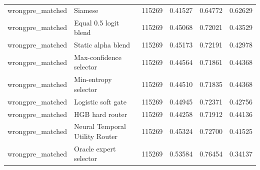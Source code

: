 \begin{tabular}{llrrrr}
wrongpre\_matched & Siamese & 115269 & 0.41527 & 0.64772 & 0.62629 \\
wrongpre\_matched & Equal 0.5 logit blend & 115269 & 0.45068 & 0.72021 & 0.43529 \\
wrongpre\_matched & Static alpha blend & 115269 & 0.45173 & 0.72191 & 0.42978 \\
wrongpre\_matched & Max-confidence selector & 115269 & 0.44564 & 0.71861 & 0.44368 \\
wrongpre\_matched & Min-entropy selector & 115269 & 0.44510 & 0.71835 & 0.44368 \\
wrongpre\_matched & Logistic soft gate & 115269 & 0.44945 & 0.72371 & 0.42756 \\
wrongpre\_matched & HGB hard router & 115269 & 0.44258 & 0.71912 & 0.44136 \\
wrongpre\_matched & Neural Temporal Utility Router & 115269 & 0.45324 & 0.72700 & 0.41525 \\
wrongpre\_matched & Oracle expert selector & 115269 & 0.53584 & 0.76454 & 0.34137 \\
\bottomrule
\end{tabular}
